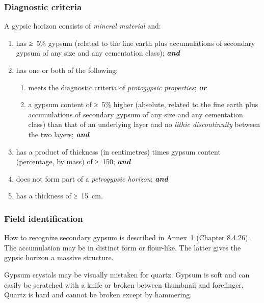 \documentclass[
  letterpaper,
  DIV=11,
  numbers=noendperiod]{scrreprt}
\providecommand{\tightlist}{%
  \setlength{\itemsep}{0pt}\setlength{\parskip}{0pt}}\usepackage{longtable,booktabs,array}
\begin{document}
\hypertarget{diagnostic-criteria-13}{%
\subsubsection{Diagnostic criteria}\label{diagnostic-criteria-13}}

A gypsic horizon consists of \emph{mineral material} and:

\begin{enumerate}
\def\labelenumi{\arabic{enumi}.}
\item
  has ≥~5\% gypsum (related to the fine earth plus accumulations of
  secondary gypsum of any size and any cementation class);
  \textbf{\emph{and}}
\item
  has one or both of the following:

  \begin{enumerate}
  \def\labelenumii{\alph{enumii}.}
  \tightlist
  \item
    meets the diagnostic criteria of \emph{protogypsic properties};
    \textbf{\emph{or}}
  \item
    a gypsum content of ≥~5\% higher (absolute, related to the fine
    earth plus accumulations of secondary gypsum of any size and any
    cementation class) than that of an underlying layer and no
    \emph{lithic discontinuity} between the two layers;
    \textbf{\emph{and}}
  \end{enumerate}
\item
  has a product of thickness (in centimetres) times gypsum content
  (percentage, by mass) of ≥~150; \textbf{\emph{and}}
\item
  does not form part of a \emph{petrogypsic horizon};
  \textbf{\emph{and}}
\item
  has a thickness of ≥~15~cm.
\end{enumerate}

\hypertarget{field-identification-9}{%
\subsubsection{Field identification}\label{field-identification-9}}

How to recognize secondary gypsum is described in Annex~1 (Chapter
8.4.26). The accumulation may be in distinct form or flour-like. The
latter gives the gypsic horizon a massive structure.

Gypsum crystals may be visually mistaken for quartz. Gypsum is soft and
can easily be scratched with a knife or broken between thumbnail and
forefinger. Quartz is hard and cannot be broken except by hammering.
\end{document}
